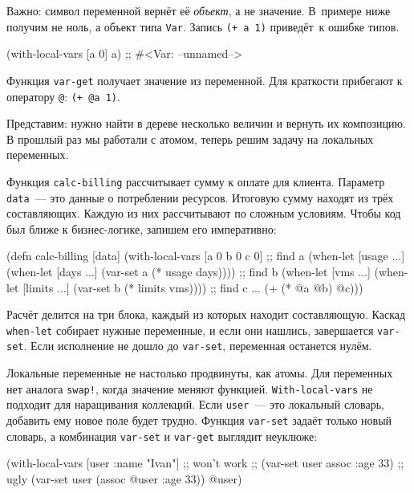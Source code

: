 Важно: символ переменной вернёт её \emph{объект}, а не значение. В~примере ниже
получим не ноль, а объект типа \verb|Var|. Запись \verb|(+ a 1)| приведёт~к
ошибке типов.

\begin{english}
  \begin{clojure}
(with-local-vars [a 0] a)
;; #<Var: --unnamed-->
  \end{clojure}
\end{english}

Функция \verb|var-get| получает значение из переменной. Для краткости
прибегают к оператору \verb|@|: \verb|(+ @a 1)|.

Представим: нужно найти в дереве несколько величин и вернуть их композицию. В
прошлый раз мы работали с атомом, теперь решим задачу на локальных переменных.

Функция \verb|calc-billing| рассчитывает сумму к оплате для клиента. Параметр
\verb|data|~--- это данные о потреблении ресурсов. Итоговую сумму находят из трёх
составляющих. Каждую из них рассчитывают по сложным условиям. Чтобы код был
ближе к бизнес-логике, запишем его императивно:

\begin{english}
  \begin{clojure}
(defn calc-billing [data]
  (with-local-vars
    [a 0 b 0 c 0]
    ;; find a
    (when-let [usage ...]
      (when-let [days ...]
        (var-set a (* usage days))))
    ;; find b
    (when-let [vms ...]
      (when-let [limits ...]
        (var-set b (* limits vms))))
    ;; find c ...
    (+ (* @a @b) @c)))
  \end{clojure}
\end{english}

Расчёт делится на три блока, каждый из которых находит составляющую. Каскад
\verb|when-let| собирает нужные переменные, и если они нашлись, завершается
\verb|var-set|. Если исполнение не дошло до \verb|var-set|, переменная
останется нулём.

Локальные переменные не настолько продвинуты, как атомы. Для переменных нет
аналога \verb|swap!|, когда значение меняют функцией. \verb|With-local-vars|
не подходит для наращивания коллекций. Если \verb|user|~--- это локальный словарь,
добавить ему новое поле будет трудно. Функция \verb|var-set| задаёт только
новый словарь, а комбинация \verb|var-set| и \verb|var-get| выглядит
неуклюже:

\ifx\DEVICETYPE\MOBILE

\begin{english}
  \begin{clojure}
(with-local-vars [user {:name "Ivan"}]
  ;; won't work
  ;; (var-set user assoc :age 33)
  ;; ugly
  (var-set user (assoc @user :age 33))
  @user)
  \end{clojure}
\end{english}

